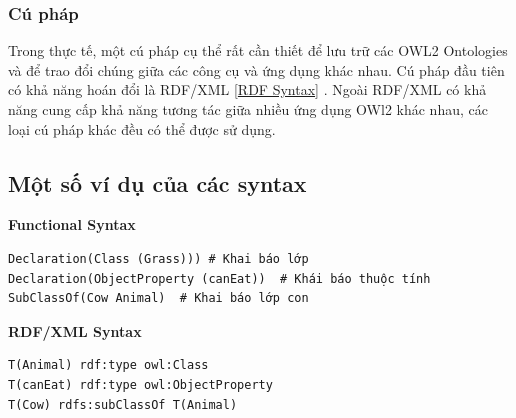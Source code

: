 \subsubsection{Cú pháp}
Trong thực tế, một cú pháp cụ thể rất cần thiết để lưu trữ các OWL2 Ontologies và để trao đổi chúng giữa các công cụ và ứng dụng khác nhau. Cú pháp đầu tiên có khả năng hoán đổi là RDF/XML [\href{http://www.w3.org/TR/owl2-overview/#ref-rdf-syntax}{RDF Syntax}] \cite{rdfxml}. Ngoài RDF/XML có khả năng cung cấp khả năng tương tác giữa nhiều ứng dụng OWl2 khác nhau, các loại cú pháp khác đều có thể được sử dụng. 
\subsection{Một số ví dụ của các syntax}

\textbf{Functional Syntax}
\begin{verbatim}
Declaration(Class (Grass))) # Khai báo lớp
Declaration(ObjectProperty (canEat))  # Khái báo thuộc tính
SubClassOf(Cow Animal)  # Khai báo lớp con
\end{verbatim}

\textbf{RDF/XML Syntax}
\begin{verbatim}
T(Animal) rdf:type owl:Class
T(canEat) rdf:type owl:ObjectProperty
T(Cow) rdfs:subClassOf T(Animal) 
\end{verbatim}


